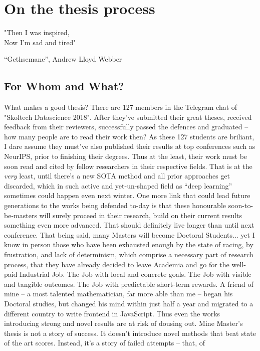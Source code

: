 \chapter{On the thesis process}

\epigraph{"Then I was inspired,\\
Now I'm sad and tired"
}{``Gethsemane'', Andrew Lloyd Webber}

\section*{For Whom and What?}

What makes a good thesis? There are 127 members in the Telegram chat of
"Skoltech Datascience 2018". After they've submitted their great theses,
received feedback from their reviewers, successfully passed the defences and
graduated -- how many people are to read their work then? As these 127 students
are briliant, I dare assume they must've also published their results at top
conferences such as NeurIPS, prior to finishing their degrees. Thus at the
least, their work must be soon read and cited by fellow researchers in their
respective fields.  That is at the \emph{very} least, until there's a new SOTA
method and all prior approaches get discarded, which in such active and
yet-un-shaped field as ``deep learning'' sometimes could happen even next
winter. One more link that could lead future generations to the works being
defended to-day is that these honourable soon-to-be-masters will surely proceed
in their research, build on their current results something even more advanced.
That should definitely live longer than until next conference.  That being
said, many Masters will become Doctoral Students... yet I know in person those
who have been exhausted enough by the state of racing, by frustration, and lack
of determinism, which comprise a necessary part of research process, that they
have already decided to leave Academia and go for the well-paid Industrial Job.
The Job with local and concrete goals.  The Job with visible and tangible
outcomes. The Job with predictable short-term rewards.  A friend of mine -- a
most talented mathematician, far more able than me -- began his Doctoral
studies, but changed his mind within just half a year and migrated to a
different country to write frontend in JavaScript. Thus even the works
introducing strong and novel results are at risk of dousing out. Mine Master's
thesis is not a story of success. It doesn't introduce novel methods that beat
state of the art scores. Instead, it's a story of failed attempts -- that, of
